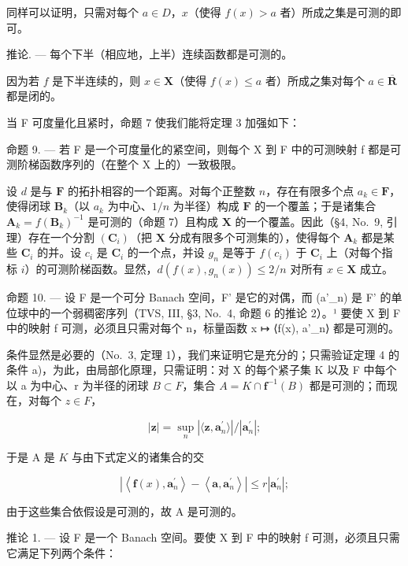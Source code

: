 同样可以证明，只需对每个 \(a \in D\)，\(x\)（使得 \(f(x) > a\) 者）所成之集是可测的即可。

推论. --- 每个下半（相应地，上半）连续函数都是可测的。

因为若 \(f\) 是下半连续的，则 \(x \in \mathbf{X}\)（使得 \(f(x) \leqslant a\) 者）所成之集对每个 \(a \in \overline{\mathbf{R}}\) 都是闭的。

当 F 可度量化且紧时，命题 7 使我们能将定理 3 加强如下：

命题 9. --- 若 F 是一个可度量化的紧空间，则每个 X 到 F 中的可测映射 f 都是可测阶梯函数序列的（在整个 X 上的）一致极限。

设 \(d\) 是与 \(\mathbf{F}\) 的拓扑相容的一个距离。对每个正整数 \(n\)，存在有限多个点 \(a_{k} \in \mathbf{F}\)，使得闭球 \(\mathbf{B}_{k}\)（以 \(a_{k}\) 为中心、\(1/n\) 为半径）构成 \(\mathbf{F}\) 的一个覆盖；于是诸集合 \(\mathbf{A}_{k} = f(\mathbf{B}_{k})^{-1}\) 是可测的（命题 7）且构成 \(\mathbf{X}\) 的一个覆盖。因此（§4, No.~9, 引理）存在一个分割 \((\mathbf{C}_{i})\)（把 \(\mathbf{X}\) 分成有限多个可测集的），使得每个 \(\mathbf{A}_{k}\) 都是某些 \(\mathbf{C}_{i}\) 的并。设 \(c_{i}\) 是 \(\mathbf{C}_{i}\) 的一个点，并设 \(g_{n}\) 是等于 \(f(c_{i})\) 于 \(\mathbf{C}_{i}\) 上（对每个指标 \(i\)）的可测阶梯函数。显然，\(d(f(x), g_{n}(x)) \leqslant 2/n\) 对所有 \(x \in \mathbf{X}\) 成立。

命题 10. --- 设 F 是一个可分 Banach 空间，F' 是它的对偶，而 (a'\_n) 是 F' 的单位球中的一个弱稠密序列（TVS, III, §3, No.~4, 命题 6 的推论 2）。¹ 要使 X 到 F 中的映射 f 可测，必须且只需对每个 n，标量函数 x ↦ ⟨f(x), a'\_n⟩ 都是可测的。

条件显然是必要的（No.~3, 定理 1），我们来证明它是充分的；只需验证定理 4 的条件 a)，为此，由局部化原理，只需证明：对 X 的每个紧子集 K 以及 F 中每个以 a 为中心、r 为半径的闭球 \(B \subset F\)，集合 \(A = K \cap \mathbf{f}^{-1}(B)\) 都是可测的；而现在，对每个 \(z \in F\)，

\[
| \mathbf {z} | = \sup _ {n} | \langle \mathbf {z}, \mathbf {a} _ {n} ^ {\prime} \rangle | / | \mathbf {a} _ {n} ^ {\prime} |;
\]

于是 A 是 \(K\) 与由下式定义的诸集合的交

\[
\left| \left\langle \mathbf {f} (x), \mathbf {a} _ {n} ^ {\prime} \right\rangle - \left\langle \mathbf {a}, \mathbf {a} _ {n} ^ {\prime} \right\rangle \right| \leqslant r \left| \mathbf {a} _ {n} ^ {\prime} \right|;
\]

由于这些集合依假设是可测的，故 A 是可测的。

推论 1. --- 设 F 是一个 Banach 空间。要使 X 到 F 中的映射 f 可测，必须且只需它满足下列两个条件：

